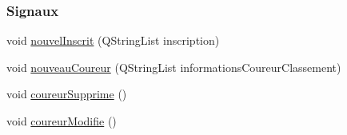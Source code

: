 \subsubsection*{Signaux}
\begin{DoxyCompactItemize}
\item 
void \hyperlink{class_gestion_b_d_d_a61bc349c8942a196e2edd3083465286f}{nouvel\+Inscrit} (Q\+String\+List inscription)
\item 
void \hyperlink{class_gestion_b_d_d_acf915265e83f03b500f10ffbde2680bb}{nouveau\+Coureur} (Q\+String\+List informations\+Coureur\+Classement)
\item 
void \hyperlink{class_gestion_b_d_d_aabb5dfcdcec4ef37477fff65f6624784}{coureur\+Supprime} ()
\item 
void \hyperlink{class_gestion_b_d_d_a911c1e7a4d8bc38566512db37b13c9f0}{coureur\+Modifie} ()
\end{DoxyCompactItemize}
